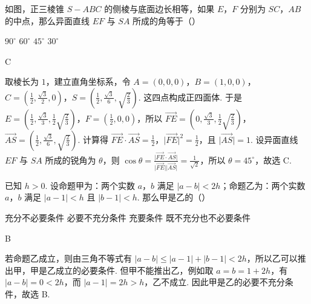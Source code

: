 \begin{problem}
如图，正三棱锥 \(S-ABC\) 的侧棱与底面边长相等，如果 \(E\)，\(F\) 分别为 \(SC\)，\(AB\) 的中点，那么异面直线 \(EF\) 与 \(SA\) 所成的角等于（\quad）


\choices
    {\(90^\circ\)}
    {\(60^\circ\)}
    {\(45^\circ\)}
    {\(30^\circ\)}

\begin{answer}
C
\end{answer}

\begin{solution}
取棱长为 \(1\)，建立直角坐标系，令 \(A=(0,0,0)\)，\(B=(1,0,0)\)，\(C=(\frac{1}{2},\frac{\sqrt{3}}{2},0)\)，\(S=(\frac{1}{2},\frac{\sqrt{3}}{6},\sqrt{\frac{2}{3}})\). 这四点构成正四面体. 于是 \(E=(\frac{1}{2},\frac{\sqrt{3}}{3},\frac{1}{2}\sqrt{\frac{2}{3}})\)，\(F=(\frac{1}{2},0,0)\)，所以 \(\overrightarrow{FE}=(0,\frac{\sqrt{3}}{3},\frac{1}{2}\sqrt{\frac{2}{3}})\)，\(\overrightarrow{AS}=(\frac{1}{2},\frac{\sqrt{3}}{6},\sqrt{\frac{2}{3}})\). 计算得 \(\overrightarrow{FE}\cdot\overrightarrow{AS}=\frac{1}{2}\)，\(\lvert\overrightarrow{FE}\rvert^2=\frac{1}{2}\)，且 \(\lvert\overrightarrow{AS}\rvert=1\). 设异面直线 \(EF\) 与 \(SA\) 所成的锐角为 \(\theta\)，则 \(\cos\theta=\frac{\lvert\overrightarrow{FE}\cdot\overrightarrow{AS}\rvert}{\lvert\overrightarrow{FE}\rvert\lvert\overrightarrow{AS}\rvert}=\frac{1}{\sqrt{2}}\)，所以 \(\theta=45^\circ\)，故选 C.
\end{solution}
\end{problem}

\begin{problem}
已知 \(h>0\). 设命题甲为：两个实数 \(a\)，\(b\) 满足 \(|a-b|<2h\)；命题乙为：两个实数 \(a\)，\(b\) 满足 \(|a-1|<h\) 且 \(|b-1|<h\). 那么甲是乙的（\quad）

\choices
    {充分不必要条件}
    {必要不充分条件}
    {充要条件}
    {既不充分也不必要条件}

\begin{answer}
B
\end{answer}

\begin{solution}
若命题乙成立，则由三角不等式有 \(\lvert a-b\rvert\leqslant\lvert a-1\rvert+\lvert b-1\rvert<2h\)，所以乙可以推出甲，甲是乙成立的必要条件. 但甲不能推出乙，例如取 \(a=b=1+2h\)，有 \(\lvert a-b\rvert=0<2h\)，而 \(\lvert a-1\rvert=2h>h\)，乙不成立. 因此甲是乙的必要不充分条件，故选 B.
\end{solution}
\end{problem}

